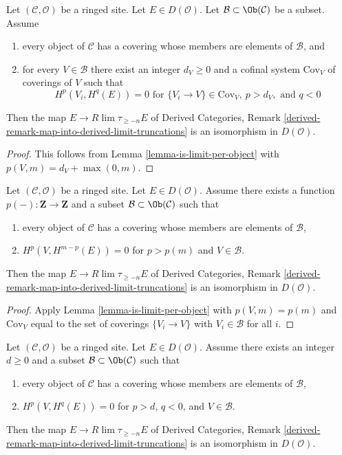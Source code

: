 \begin{lemma}
\label{lemma-is-limit-spaltenstein}
Let $(\mathcal{C}, \mathcal{O})$ be a ringed site. Let $E \in D(\mathcal{O})$.
Let $\mathcal{B} \subset \Ob(\mathcal{C})$ be a subset. Assume
\begin{enumerate}
\item every object of $\mathcal{C}$ has a covering whose members are
elements of $\mathcal{B}$, and
\item for every $V \in \mathcal{B}$ there exist an integer $d_V \geq 0$ and
a cofinal system $\text{Cov}_V$ of coverings of $V$ such that
$$
H^p(V_i, H^q(E)) = 0 \text{ for }
\{V_i \to V\} \in \text{Cov}_V,\ p > d_V, \text{ and }q < 0
$$
\end{enumerate}
Then the map $E \to R\lim \tau_{\geq -n} E$ of
Derived Categories, Remark
\ref{derived-remark-map-into-derived-limit-truncations}
is an isomorphism in $D(\mathcal{O})$.
\end{lemma}

\begin{proof}
This follows from Lemma \ref{lemma-is-limit-per-object}
with $p(V, m) = d_V + \max(0, m)$.
\end{proof}

\begin{lemma}
\label{lemma-is-limit}
Let $(\mathcal{C}, \mathcal{O})$ be a ringed site. Let $E \in D(\mathcal{O})$.
Assume there exists a function $p(-) : \mathbf{Z} \to \mathbf{Z}$
and a subset $\mathcal{B} \subset \Ob(\mathcal{C})$ such that
\begin{enumerate}
\item every object of $\mathcal{C}$ has a covering whose members are
elements of $\mathcal{B}$,
\item $H^p(V, H^{m - p}(E)) = 0$ for $p > p(m)$ and $V \in \mathcal{B}$.
\end{enumerate}
Then the map $E \to R\lim \tau_{\geq -n} E$ of
Derived Categories, Remark
\ref{derived-remark-map-into-derived-limit-truncations}
is an isomorphism in $D(\mathcal{O})$.
\end{lemma}

\begin{proof}
Apply Lemma \ref{lemma-is-limit-per-object}
with $p(V, m) = p(m)$ and $\text{Cov}_V$
equal to the set of coverings $\{V_i \to V\}$ with
$V_i \in \mathcal{B}$ for all $i$.
\end{proof}

\begin{lemma}
\label{lemma-is-limit-dimension}
Let $(\mathcal{C}, \mathcal{O})$ be a ringed site. Let $E \in D(\mathcal{O})$.
Assume there exists an integer $d \geq 0$
and a subset $\mathcal{B} \subset \Ob(\mathcal{C})$ such that
\begin{enumerate}
\item every object of $\mathcal{C}$ has a covering whose members are
elements of $\mathcal{B}$,
\item $H^p(V, H^q(E)) = 0$ for $p > d$, $q < 0$, and $V \in \mathcal{B}$.
\end{enumerate}
Then the map $E \to R\lim \tau_{\geq -n} E$ of
Derived Categories, Remark
\ref{derived-remark-map-into-derived-limit-truncations}
is an isomorphism in $D(\mathcal{O})$.
\end{lemma}

